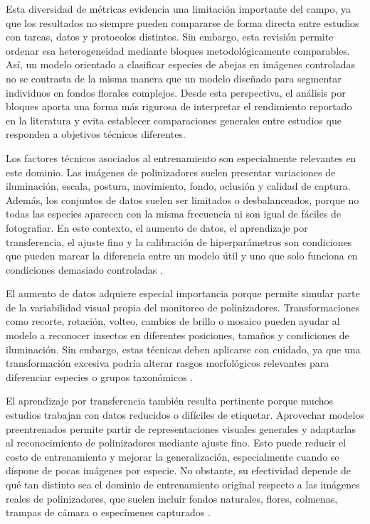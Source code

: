 Esta diversidad de métricas evidencia una limitación importante del campo, ya que los resultados no siempre pueden compararse de forma directa entre estudios con tareas, datos y protocolos distintos. Sin embargo, esta revisión permite ordenar esa heterogeneidad mediante bloques metodológicamente comparables. Así, un modelo orientado a clasificar especies de abejas en imágenes controladas no se contrasta de la misma manera que un modelo diseñado para segmentar individuos en fondos florales complejos. Desde esta perspectiva, el análisis por bloques aporta una forma más rigurosa de interpretar el rendimiento reportado en la literatura y evita establecer comparaciones generales entre estudios que responden a objetivos técnicos diferentes.

Los factores técnicos asociados al entrenamiento son especialmente relevantes en este dominio. Las imágenes de polinizadores suelen presentar variaciones de iluminación, escala, postura, movimiento, fondo, oclusión y calidad de captura. Además, los conjuntos de datos suelen ser limitados o desbalanceados, porque no todas las especies aparecen con la misma frecuencia ni son igual de fáciles de fotografiar. En este contexto, el aumento de datos, el aprendizaje por transferencia, el ajuste fino y la calibración de hiperparámetros son condiciones que pueden marcar la diferencia entre un modelo útil y uno que solo funciona en condiciones demasiado controladas \parencite{Kaur2022, nguyen2024improving, lee2025enhancing, sajib2025comparative}.

El aumento de datos adquiere especial importancia porque permite simular parte de la variabilidad visual propia del monitoreo de polinizadores. Transformaciones como recorte, rotación, volteo, cambios de brillo o mosaico pueden ayudar al modelo a reconocer insectos en diferentes posiciones, tamaños y condiciones de iluminación. Sin embargo, estas técnicas deben aplicarse con cuidado, ya que una transformación excesiva podría alterar rasgos morfológicos relevantes para diferenciar especies o grupos taxonómicos \parencite{Kaur2022, Agarwal2025, lee2025enhancing}.

El aprendizaje por transferencia también resulta pertinente porque muchos estudios trabajan con datos reducidos o difíciles de etiquetar. Aprovechar modelos preentrenados permite partir de representaciones visuales generales y adaptarlas al reconocimiento de polinizadores mediante ajuste fino. Esto puede reducir el costo de entrenamiento y mejorar la generalización, especialmente cuando se dispone de pocas imágenes por especie. No obstante, su efectividad depende de qué tan distinto sea el dominio de entrenamiento original respecto a las imágenes reales de polinizadores, que suelen incluir fondos naturales, flores, colmenas, trampas de cámara o especímenes capturados \parencite{Jagtap2025, Burri2023, zhang2021concatenated, nguyen2024improving}.

